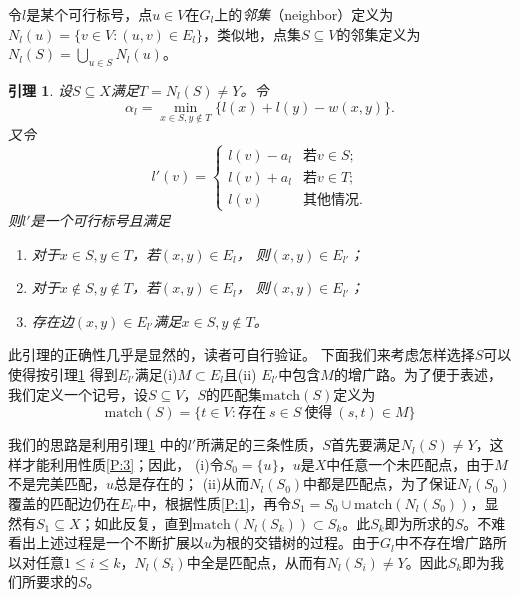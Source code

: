 \documentclass[a4paper]{ctexbook}
\newtheorem{lemma}{引理}[chapter]
\newcommand{\match}{\mathrm{match}}
\begin{document}
  令$l$是某个可行标号，点$u\in V$在$G_l$上的\emph{邻集}（neighbor）定义为$N_l(u)=\{v\in V\colon(u,v)\in E_l\}$，类似地，点集$S\subseteq V$的邻集定义为$N_l(S)=\bigcup_{u\in S}N_l(u)$。
  \begin{lemma}\label{L:improve-label}
    设$S\subseteq X$满足$T=N_l(S)\ne Y$。令
    \[
      \alpha_l = \min_{x\in S,y\notin T}\{l(x)+l(y)-w(x,y)\}.
    \]
    又令
    \[l'(v) =
    \begin{cases}
      l(v)-a_l &  \text{若$v\in S$;}\\
      l(v)+a_l &  \text{若$v\in T$;}\\
      l(v) & \text{其他情况.}
    \end{cases}
    \]
    则$l'$是一个可行标号且满足
    \begin{enumerate}
      \item 对于$x\in S,y\in T$，若$(x,y)\in E_l$， 则$(x,y)\in E_{l'}$；\label{P:1}
      \item 对于$x\notin S, y\notin T$，若$(x,y)\in E_l$， 则$(x,y)\in E_{l'}$；
      \item 存在边$(x,y)\in E_{l'}$满足$x\in S,y\notin T$。\label{P:3}
    \end{enumerate}
  \end{lemma}
  此引理的正确性几乎是显然的，读者可自行验证。
  下面我们来考虑怎样选择$S$可以使得按引理\ref{L:improve-label} 得到$E_{l'}$满足(i)$M\subset E_l$且(ii) $E_{l'}$中包含$M$的增广路。为了便于表述，我们定义一个记号，设$S\subseteq V$，$S$的匹配集$\match(S)$定义为
  \[\match(S)=\{t\in V\colon\text{存在}\ s\in S\ \text{使得}\ (s,t)\in M\}\]

  我们的思路是利用引理\ref{L:improve-label} 中的$l'$所满足的三条性质，$S$首先要满足$N_l(S)\ne Y$，这样才能利用性质\ref{P:3}；因此，
  (i)令$S_0=\{u\}$，$u$是$X$中任意一个未匹配点，由于$M$不是完美匹配，$u$总是存在的；
  (ii)从而$N_l(S_0)$中都是匹配点，为了保证$N_l(S_0)$覆盖的匹配边仍在$E_{l'}$中，根据性质\ref{P:1}，再令$S_1=S_0\cup\match(N_l(S_0))$，显然有$S_1\subseteq{X}$；如此反复，直到$\match(N_l(S_k))\subset S_k$。此$S_k$即为所求的$S$。不难看出上述过程是一个不断扩展以$u$为根的交错树的过程。由于$G_l$中不存在增广路所以对任意$1\le i\le k$，$N_l(S_i)$中全是匹配点，从而有$N_l(S_i)\ne Y$。因此$S_k$即为我们所要求的$S$。
\end{document}
